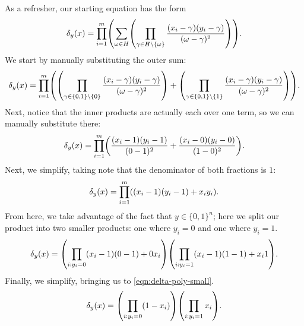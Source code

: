\documentclass[english,12pt]{reedthesis}
\theoremstyle{plain}
\theoremstyle{definition}
\theoremstyle{remark}
\begin{document}
\begin{appendices}
As a refresher, our starting equation has the form
\begin{equation}
  \delta_{y}(x) = \prod_{i = 1}^{m}\mleft(\sum_{\omega \in H}\mleft(
  \prod_{\gamma \in H \setminus \{\omega\}}\frac{(x_{i} - \gamma)(y_{i} - \gamma)}{(\omega - \gamma)^{2}}
  \mright)\mright).
\end{equation}
We start by manually substituting the outer sum:
\begin{equation}
  \delta_{y}(x) = \prod_{i = 1}^{m}\mleft(\mleft(
    \prod_{\gamma \in \{0, 1\} \setminus \{0\}}\frac{(x_{i} - \gamma)(y_{i} - \gamma)}{(\omega - \gamma)^{2}}
    \mright) + \mleft(
    \prod_{\gamma \in \{0, 1\} \setminus \{1\}}\frac{(x_{i} - \gamma)(y_{i} - \gamma)}{(\omega - \gamma)^{2}}
    \mright)
  \mright).
\end{equation}
Next, notice that the inner products are actually each over one term, so we can
manually substitute there:
\begin{equation}
  \delta_{y}(x) = \prod_{i = 1}^{m}\mleft(
    \frac{(x_{i} - 1)(y_{i} - 1)}{(0 - 1)^{2}} +
    \frac{(x_{i} - 0)(y_{i} - 0)}{(1 - 0)^{2}}
  \mright).
\end{equation}
Next, we simplify, taking note that the denominator of both fractions is $1$:
\begin{equation}
  \delta_{y}(x) = \prod_{i = 1}^{m}\mleft((x_{i} - 1)(y_{i} - 1) + x_{i}y_{i}\mright).
\end{equation}
From here, we take advantage of the fact that $y \in \{0, 1\}^{n}$; here we split
our product into two smaller products: one where $y_{i} = 0$ and one where
$y_{i} = 1$.
\begin{equation}
  \delta_{y}(x) = \mleft(\prod_{i:y_{i}=0}(x_{i} - 1)(0 - 1) + 0x_{i}\mright)
  \mleft(\prod_{i:y_{i}=1}(x_{i} - 1)(1 - 1) + x_{i}1\mright).
\end{equation}
Finally, we simplify, bringing us to \cref{eqn:delta-poly-small}.
\begin{equation}
  \delta_{y}(x) = \mleft(\prod_{i:y_{i}=0}(1 - x_{i})\mright)\mleft(\prod_{i:y_{i}=1}x_{i}\mright).
\end{equation}

\end{appendices}

\printbibliography[heading=bibintoc]{}

\printindex{}
\end{document}
